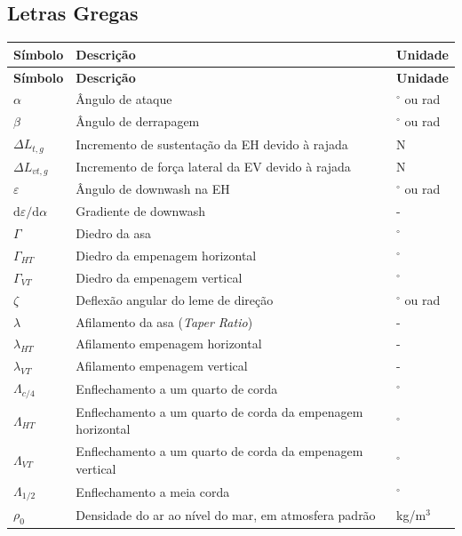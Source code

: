 \subsection*{Letras Gregas}
\begin{longtable}{p{} p{} p{}}
\textbf{Símbolo} & \textbf{Descrição} & \textbf{Unidade} \\ \hline
\endfirsthead
\textbf{Símbolo} & \textbf{Descrição} & \textbf{Unidade} \\ \hline
\endhead
$\alpha$ & Ângulo de ataque & $^\circ$ ou rad \\
$\beta$ & Ângulo de derrapagem & $^\circ$ ou rad \\
$\Delta L_{t,g}$ & Incremento de sustentação da EH devido à rajada & N \\
$\Delta L_{vt,g}$ & Incremento de força lateral da EV devido à rajada & N \\
$\varepsilon$ & Ângulo de downwash na EH & $^\circ$ ou rad \\
$\mathrm{d}\varepsilon/\mathrm{d}\alpha$ & Gradiente de downwash & - \\
$\Gamma$ & Diedro da asa & $^\circ$ \\
$\Gamma_{HT}$ & Diedro da empenagem horizontal & $^\circ$ \\
$\Gamma_{VT}$ & Diedro da empenagem vertical & $^\circ$ \\
$\zeta$ & Deflexão angular do leme de direção & $^\circ$ ou rad \\
$\lambda$ & Afilamento da asa (\textit{Taper Ratio}) & - \\
$\lambda_{HT}$ & Afilamento empenagem horizontal & - \\
$\lambda_{VT}$ & Afilamento empenagem vertical & - \\
$\Lambda_{c/4}$ & Enflechamento a um quarto de corda & $^\circ$ \\
$\Lambda_{HT}$ & Enflechamento a um quarto de corda da empenagem horizontal & $^\circ$ \\
$\Lambda_{VT}$ & Enflechamento a um quarto de corda da empenagem vertical & $^\circ$ \\
$\Lambda_{1/2}$ & Enflechamento a meia corda & $^\circ$ \\
$\rho_0$ & Densidade do ar ao nível do mar, em atmosfera padrão & kg/m$^3$ \\

\hline
\end{longtable}

